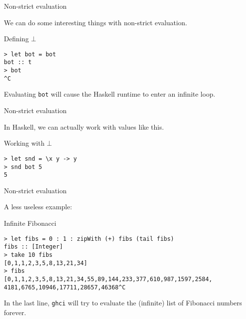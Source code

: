 %
\begin{frame}[fragile]{Non-strict evaluation}

We can do some interesting things with non-strict evaluation.

\begin{block}{Defining $\bot$}
\begin{verbatim}
> let bot = bot
bot :: t
> bot
^C
\end{verbatim}
\end{block}

Evaluating \texttt{bot} will cause the Haskell runtime to enter an infinite
loop.

\end{frame}

%
\begin{frame}[fragile]{Non-strict evaluation}

In Haskell, we can actually work with values like this.

\begin{block}{Working with $\bot$}
\begin{verbatim}
> let snd = \x y -> y
> snd bot 5
5
\end{verbatim}
\end{block}

\end{frame}

%
\begin{frame}[fragile]{Non-strict evaluation}

A less useless example:

\begin{block}{Infinite Fibonacci}
\begin{verbatim}
> let fibs = 0 : 1 : zipWith (+) fibs (tail fibs)
fibs :: [Integer]
> take 10 fibs
[0,1,1,2,3,5,8,13,21,34]
> fibs
[0,1,1,2,3,5,8,13,21,34,55,89,144,233,377,610,987,1597,2584,
4181,6765,10946,17711,28657,46368^C
\end{verbatim}
\end{block}

In the last line, \texttt{ghci} will try to evaluate the (infinite) list of
Fibonacci numbers forever.

\end{frame}
